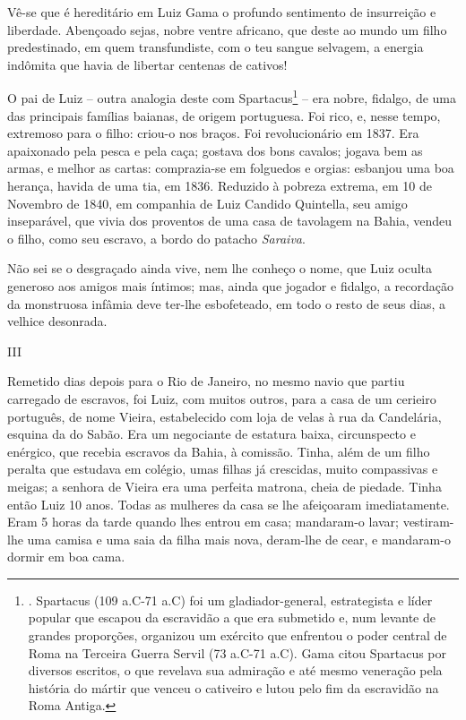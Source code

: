 Vê-se que é hereditário em Luiz Gama o profundo sentimento de
insurreição e liberdade. Abençoado sejas, nobre ventre africano, que
deste ao mundo um filho predestinado, em quem transfundiste, com o teu
sangue selvagem, a energia indômita que havia de libertar centenas de
cativos!

O pai de Luiz -- outra analogia deste com Spartacus\footnote{. Spartacus
  (109 a.C-71 a.C) foi um gladiador-general, estrategista e líder
  popular que escapou da escravidão a que era submetido e, num levante
  de grandes proporções, organizou um exército que enfrentou o poder
  central de Roma na Terceira Guerra Servil (73 a.C-71 a.C). Gama citou
  Spartacus por diversos escritos, o que revelava sua admiração e até
  mesmo veneração pela história do mártir que venceu o cativeiro e lutou
  pelo fim da escravidão na Roma Antiga.} -- era nobre, fidalgo, de uma
das principais famílias baianas, de origem portuguesa. Foi rico, e,
nesse tempo, extremoso para o filho: criou-o nos braços. Foi
revolucionário em 1837. Era apaixonado pela pesca e pela caça; gostava
dos bons cavalos; jogava bem as armas, e melhor as cartas: comprazia-se
em folguedos e orgias: esbanjou uma boa herança, havida de uma tia, em
1836. Reduzido à pobreza extrema, em 10 de Novembro de 1840, em
companhia de Luiz Candido Quintella, seu amigo inseparável, que vivia
dos proventos de uma casa de tavolagem na Bahia, vendeu o filho, como
seu escravo, a bordo do patacho \emph{Saraiva}.

Não sei se o desgraçado ainda vive, nem lhe conheço o nome, que Luiz
oculta generoso aos amigos mais íntimos; mas, ainda que jogador e
fidalgo, a recordação da monstruosa infâmia deve ter-lhe esbofeteado, em
todo o resto de seus dias, a velhice desonrada.

III

Remetido dias depois para o Rio de Janeiro, no mesmo navio que partiu
carregado de escravos, foi Luiz, com muitos outros, para a casa de um
cerieiro português, de nome Vieira, estabelecido com loja de velas à rua
da Candelária, esquina da do Sabão. Era um negociante de estatura baixa,
circunspecto e enérgico, que recebia escravos da Bahia, à comissão.
Tinha, além de um filho peralta que estudava em colégio, umas filhas já
crescidas, muito compassivas e meigas; a senhora de Vieira era uma
perfeita matrona, cheia de piedade. Tinha então Luiz 10 anos. Todas as
mulheres da casa se lhe afeiçoaram imediatamente. Eram 5 horas da tarde
quando lhes entrou em casa; mandaram-o lavar; vestiram-lhe uma camisa e
uma saia da filha mais nova, deram-lhe de cear, e mandaram-o dormir em
boa cama.

